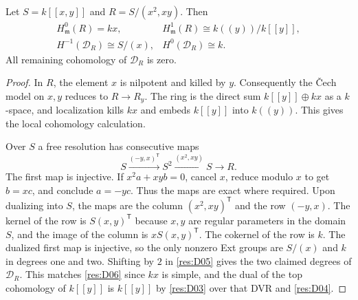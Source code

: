 \begin{example}\label{res:E04}
Let $S=k[[x,y]]$ and $R=S/(x^2,xy)$. Then
\[
 \begin{array}{ll}
 H^0_{\mathfrak m}(R)=kx, &
 H^1_{\mathfrak m}(R)\cong k((y))/k[[y]],\\[2pt]
 H^{-1}(\mathcal D_R)\cong S/(x), &
 H^0(\mathcal D_R)\cong k .
 \end{array}
\]
All remaining cohomology of $\mathcal D_R$ is zero.
\end{example}
\begin{proof}
In $R$, the element $x$ is nilpotent and killed by $y$.
Consequently the \v{C}ech model on $x,y$ reduces to $R\to R_y$.
The ring is the direct sum $k[[y]]\oplus kx$ as a $k$-space,
and localization kills $kx$ and embeds $k[[y]]$ into $k((y))$.
This gives the local cohomology calculation.

Over $S$ a free resolution has consecutive maps
\[
        S\xrightarrow{(-y,x)^{\mathsf T}} S^2
          \xrightarrow{(x^2,xy)} S \longrightarrow R .
\]
The first map is injective. If $x^2a+xyb=0$, cancel $x$, reduce
modulo $x$ to get $b=xc$, and conclude $a=-yc$. Thus the maps
are exact where required. Upon dualizing into $S$, the maps
are the column $(x^2,xy)^{\mathsf T}$ and the row $(-y,x)$.
The kernel of the row is $S(x,y)^{\mathsf T}$ because $x,y$
are regular parameters in the domain $S$, and the image of
the column is $x S(x,y)^{\mathsf T}$. The cokernel of the row
is $k$. The dualized first map is injective, so the only nonzero
Ext groups are $S/(x)$ and $k$ in degrees one and two.
Shifting by $2$ in \ref{res:D05} gives the two claimed degrees
of $\mathcal D_R$. This matches \ref{res:D06} since $kx$ is simple,
and the dual of the top cohomology of $k[[y]]$ is $k[[y]]$
by \ref{res:D03} over that DVR and \ref{res:D04}.
\end{proof}

